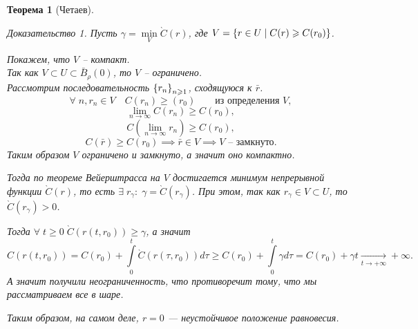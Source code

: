 \documentclass[a5paper, 10pt]{article}
\theoremstyle{definition}
\theoremstyle{plain}
\newtheorem{Th}{Теорема}
\theoremstyle{remark}
\newtheorem*{Proof}{Доказательство}
\begin{document}
\begin{Th}[Четаев]
\begin{Proof}
		Пусть $\gamma = \min\limits_V \grave{C}(r)$, где $V=\left\{r\in U \;|\; C(r) \geqslant C(r_0)\right\}$.
		
		Покажем, что $V$ -- компакт.\\
		Так как $V\subset U \subset \bar{B}_{\rho}(0)$, то $V$ -- ограничено.\\
		Рассмотрим последовательность $\left\{r_n\right\}_{n\geqslant1}$, сходящуюся к $\bar{r}$. 
		\[
		\forall \; n, r_n \in V \quad C(r_n) \geqslant(r_0) \qquad \text{из определения $V$},
		\]
		\[
		\lim\limits_{n\to \infty} C(r_n) \geqslant C(r_0),
		\]
		\[
		C(\lim\limits_{n\to \infty} r_n) \geqslant C(r_0),
		\]
		\[
		C(\bar{r}) \geqslant C(r_0) \implies \bar{r} \in V \implies \text{$V$ -- замкнуто}.
		\]
		Таким образом $V$ ограничено и замкнуто, а значит оно компактно.
		
		Тогда по теореме Вейерштрасса на $V$ достигается минимум непрерывной функции $\grave{C}(r)$, то есть $\exists\; r_\gamma: \; \gamma = \grave{C}(r_\gamma)$. При этом, так как $r_\gamma \in V \subset U$, то $\grave{C}(r_\gamma) > 0$.
		
		Тогда $\forall\; t \geqslant 0 \; \grave{C}(r(t,r_0)) \geqslant \gamma$, а значит
		\[
		C(r(t,r_0)) = C(r_0) + \int\limits_0^t \grave{C}(r(\tau, r_0))d\tau \geqslant C(r_0) + \int\limits_0^t \gamma d\tau = C(r_0) + \gamma t \underset{t\to + \infty}{\to} +\infty.
		\]
		А значит получили неограниченность, что противоречит тому, что мы рассматриваем все в шаре.
		
		Таким образом, на самом деле, $r=0$ --- неустойчивое положение равновесия.
		\end{Proof}
	\end{Th}
\end{document}
